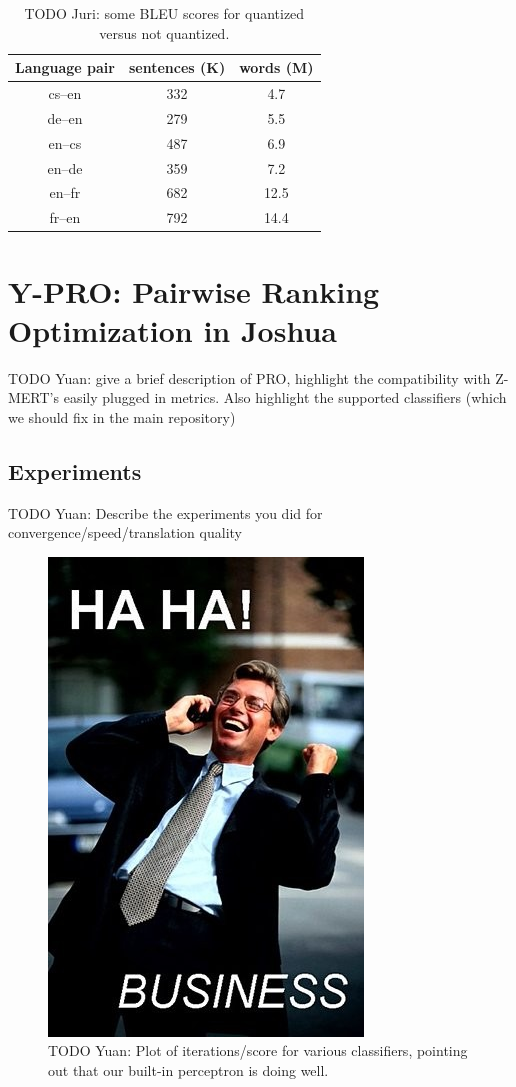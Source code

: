 \documentclass[11pt]{article}
\begin{document}
\begin{table}
\centering
\begin{tabular}{|c|c|c|}
Language pair & sentences (K) & words (M) \\
\hline\hline
cs--en & 332 & 4.7 \\
de--en & 279 & 5.5 \\
en--cs & 487 & 6.9 \\
en--de & 359 & 7.2 \\
en--fr & 682 & 12.5 \\
fr--en & 792 & 14.4 \\
\end{tabular}
\caption{TODO Juri: some BLEU scores for quantized versus not quantized.}
\end{table}


\section{Y-PRO: Pairwise Ranking Optimization in Joshua}
\label{section:results}

TODO Yuan: give a brief description of PRO, highlight the
compatibility with Z-MERT's easily plugged in metrics. Also highlight
the supported classifiers (which we should fix in the main repository) 

\subsection{Experiments}

TODO Yuan: Describe the experiments you did for
convergence/speed/translation quality

\begin{figure}[!t]
\begin{center}
\includegraphics[width=0.4\linewidth]{figures/placeholder.jpeg}
\end{center}
\caption{TODO Yuan: Plot of iterations/score for various classifiers,
  pointing out that our built-in perceptron is doing well.}
\label{fig-example-compression}
\end{figure}
\end{document}
